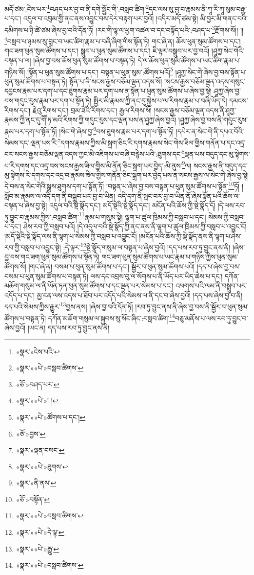མདོ་ཙམ་:ངེས་པར་\footnote{«སྣར་»ངེས་པའི་}བཤད་པར་བྱ་བ་ནི་དགེ་སྦྱོང་གི་:བསླབ་ཚིག་\footnote{«སྣར་»«པེ་»བསླབ་ཚིགས་}དང་ལས་སུ་བྱ་བ་རྣམས་ནི་ཀཱ་རི་ཀཱ་སུམ་བརྒྱ་པ་དང་། འདུལ་བ་འབུམ་གྱི་ནང་ནས་འབྱུང་བས་དེར་བརྟག་པར་བྱའོ། །འདིར་མདོ་ཙམ་སྟེ། མི་བྱར་མི་གནང་བའི་དམིགས་པ་ཉི་ཚེ་ཙམ་ཞེས་བྱ་བའི་དོན་ཏོ། །རང་གི་ལྷ་ལ་ཕྱག་འཚལ་བ་དང་བསྟོད་པའི་:བཤད་པ་\footnote{«ཅོ་»བཤད་པར་}རྫོགས་སོ།། །།\footnote{«སྣར་»«པེ་»། །}བསླབ་པ་ཉམས་སུ་བླང་བ་ཡང་ཚིག་རྣམ་པ་བཞི་ཞིག་གིས་སྟོན་ཏེ། གང་ཞེ་ན། ཆོས་ཕུན་སུམ་ཚོགས་པ་དང་། གང་ཟག་ཕུན་སུམ་ཚོགས་པ་དང་། སྒྲུབ་པ་ཕུན་སུམ་ཚོགས་པ་དང་། ཇི་ལྟར་བསྒྲུབ་པར་བྱ་བའོ། །ཤཱཀྱ་སེང་གེའི་བསྟན་པ་ལ། །ཞེས་བྱ་བས་ཆོས་ཕུན་སུམ་ཚོགས་པ་བསྟན་ཏེ། དེ་ལ་ཆོས་ཕུན་སུམ་ཚོགས་པ་ཡང་ཚིག་རྣམ་པ་གཉིས་སོ། །སྟོན་པ་ཕུན་སུམ་ཚོགས་པ་དང་། བསྟན་པ་ཕུན་སུམ་:ཚོགས་པའོ།\footnote{«སྣར་»«པེ་»ཚོགས་པ་དང་།} །ཤཱཀྱ་སེང་གེ་ཞེས་བྱ་བས་སྟོན་པ་ཕུན་སུམ་ཚོགས་པ་བསྟན་ཏེ། སྟོན་པ་ནི་སངས་རྒྱས་བཅོམ་ལྡན་འདས་སོ། །སངས་རྒྱས་བཅོམ་ལྡན་འདས་གསུང་དབྱངས་རྣམ་པར་དག་པ་དང་ཐུགས་རྣམ་པར་དག་པས་ན་སྟོན་པ་ཕུན་སུམ་ཚོགས་པ་ཞེས་བྱ་སྟེ། ཤཱཀྱ་ཞེས་བྱ་བས་གདུང་རུས་རྣམ་པར་དག་པ་སྟོན་ཏེ། སྤྱིར་མི་རྣམས་ཀྱི་ནང་དུ་སྐྱེས་པ་ལ་རིགས་རྣམ་པ་བཞི་ཡོད་དེ། དམངས་རིགས་དང་། རྗེའུ་རིགས་དང་། བྲམ་ཟེའི་རིགས་དང་། རྒྱལ་རིགས་སོ། །སངས་རྒྱས་བཅོམ་ལྡན་འདས་ནི་ཤཱཀྱ་རྣམས་ཀྱི་ནང་དུ་གཽ་ཏ་མའི་རིགས་ཀྱི་གདུང་རུས་དང་ལྡན་པས་ན་ཤཱཀྱ་ཞེས་བྱའོ། །ཤཱཀྱ་ཞེས་བྱ་བས་ནི་གདུང་རུས་རྣམ་པར་དག་པ་སྟོན་ཏོ། །སེང་གེ་ཞེས་བྱ་\footnote{«ཅོ་»བྱས་}བས་ཐུགས་རྣམ་པར་དག་པ་སྟོན་ཏོ། །དཔེར་ན་སེང་གེ་ནི་དཔའ་བོའི་སེམས་དང་:ལྡན་པས་རི་\footnote{«སྣར་»ལྡན་བསང་}དགས་རྣམས་ཀྱིས་མི་སྐྲག་ཅིང་རི་དགས་རྣམས་སེང་གེས་ཟིལ་གྱིས་གནོན་པ་དང་འདྲ་བར་སངས་རྒྱས་བཅོམ་ལྡན་འདས་ཀྱང་མི་འཇིགས་པ་བཞི་བརྙེས་པའི་:ཐུགས་དང་\footnote{«སྣར་»«པེ་»ཐུགས་}ལྡན་པས་བདུད་དང་མུ་སྟེགས་པ་རི་དགས་དང་འདྲ་བས་སངས་རྒྱས་ཟིལ་གྱིས་མི་ནོན་ཅིང་སྐྲག་པར་བྱེད་:མི་ནུས་\footnote{«སྣར་»ནི་ནས་}ལ། སངས་རྒྱས་ནི་བདུད་དང་མུ་སྟེགས་རི་དགས་དང་འདྲ་བ་རྣམས་ཟིལ་གྱིས་གནོན་ཅིང་སྐྲག་པར་བྱེད་པས་ན་སངས་རྒྱས་ལ་སེང་གེ་ཞེས་བྱ་སྟེ། དེ་བས་ན་སེང་གེའི་སྒྲས་ཐུགས་དག་པ་སྟོན་ཏོ། །བསྟན་པ་ཞེས་བྱ་བས་བསྟན་པ་ཕུན་སུམ་ཚོགས་པ་སྟོན་\footnote{«ཅོ་»བསྟོན་}ཏོ། །སློབ་མ་རྣམས་ལ་འདི་དག་ནི་བསྒྲུབ་པར་བྱ་བ་ཡིན། འདི་དག་ནི་སྤང་བར་བྱ་བ་ཡིན་ནོ་ཞེས་སྟོན་པའི་ཆོས་ལ་བསྟན་པ་ཞེས་བྱ་སྟེ། འདུལ་བའི་སྡེ་སྣོད་དང་། མདོ་སྡེའི་སྡེ་སྣོད་དང་། མངོན་པའི་ཆོས་ཀྱི་སྡེ་སྣོད་དོ། །དེ་ལས་རབ་ཏུ་བྱུང་བ་རྣམས་ཀྱིས་:བསླབ་ཚིག་\footnote{«སྣར་»«པེ་»བསླབ་ཚིགས་}རྣམ་པ་གསུམ་སྟེ། ལྷག་པ་ཚུལ་ཁྲིམས་ཀྱི་བསླབ་པ་དང་། སེམས་ཀྱི་བསླབ་པ་དང་། ཤེས་རབ་ཀྱི་བསླབ་པའོ། །དེ་འདུལ་བའི་སྡེ་སྣོད་ཀྱི་ནང་ནས་ནི་ལྷག་པ་ཚུལ་ཁྲིམས་ཀྱི་བསླབ་པ་འབྱུང་ངོ། །མདོ་སྡེའི་སྡེ་སྣོད་ལས་ནི་ལྷག་པ་སེམས་ཀྱི་བསླབ་པ་འབྱུང་ངོ། །མངོན་པའི་ཆོས་ཀྱི་སྡེ་སྣོད་ནས་ནི་ལྷག་པ་ཤེས་རབ་ཀྱི་བསླབ་པ་འབྱུང་སྟེ། :དེ་ལྟར་\footnote{«སྣར་»«པེ་»དེ་ལྟ་}སྡེ་སྣོད་གསུམ་ལ་བསྟན་པ་ཞེས་བྱའོ། །དད་པས་རབ་ཏུ་བྱུང་ནས་ནི། །ཞེས་བྱ་བས་གང་ཟག་ཕུན་སུམ་ཚོགས་པ་སྟོན་ཏེ། གང་ཟག་ཕུན་སུམ་ཚོགས་པ་ཡང་རྣམ་པ་གཉིས་ཀྱིས་ཕུན་སུམ་ཚོགས་སོ། །གང་ཞེ་ན། བསམ་པ་ཕུན་སུམ་ཚོགས་པ་དང་། སྦྱོར་བ་ཕུན་སུམ་ཚོགས་པའོ། །དད་པ་ཞེས་བྱ་བས་བསམ་པ་ཕུན་སུམ་ཚོགས་པ་བསྟན་ཏེ། ལས་དང་འབྲས་བུ་ལ་སོགས་པ་ནི་ཡོད་པར་ཡིད་ཆེས་པ་དང་། དཀོན་མཆོག་གསུམ་ལ་ནི་ཡོན་ཏན་ཕུན་སུམ་ཚོགས་པ་དང་ལྡན་པར་སེམས་པ་དང་། འཕགས་པའི་ལམ་ནི་བསྒྲུབ་པར་འདོད་པ་དང་། མྱ་ངན་ལས་འདས་པ་ཐོབ་པར་འདོད་པའི་སེམས་ལ་ནི་དང་བ་ཞེས་བྱའོ། །དད་པས་ཞེས་བྱ་བ་ནི། དད་པའི་སེམས་ཀྱིས་རྒྱུར་\footnote{«སྣར་»«པེ་»རྒྱུ་}བྱས་ནས། །ཞེས་བྱ་བའི་དོན་ཏོ། །རབ་ཏུ་བྱུང་ནས་ནི་ཞེས་བྱ་བས་ནི་སྦྱོར་བ་ཕུན་སུམ་ཚོགས་པ་བསྟན་ཏེ། དཀོན་མཆོག་གསུམ་ལ་སྐྱབས་སུ་སོང་ཞིང་:བསླབ་ཚིག་\footnote{«སྣར་»«པེ་»བསླབ་ཚིགས་}བཅུ་མནོས་པ་ལས་རབ་ཏུ་བྱུང་བ་ཞེས་བྱའོ། །ཡང་ན། དད་པས་རབ་ཏུ་བྱུང་ནས་ནི། 